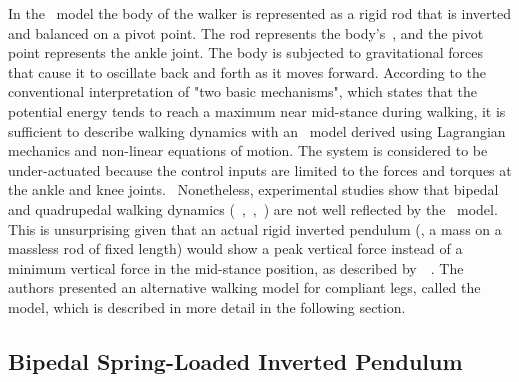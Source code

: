
    In the~ model the body of the walker is represented as a rigid rod that is inverted and balanced on a pivot point. The rod represents the body's~, and the pivot point represents the ankle joint. The body is subjected to gravitational forces that cause it to oscillate back and forth as it moves forward. According to the conventional interpretation of "two basic mechanisms", which states that the potential energy tends to reach a maximum near mid-stance during walking, it is sufficient to describe walking dynamics with an~ model derived using Lagrangian mechanics and non-linear equations of motion. The system is considered to be under-actuated because the control inputs are limited to the forces and torques at the ankle and knee joints.~\cite{Lee2018} Nonetheless, experimental studies show that bipedal and quadrupedal walking dynamics (\eg~\cite{Lee1998},~\cite{Griffin2004},~\cite{Genin2010}) are not well reflected by the~ model. This is unsurprising given that an actual rigid inverted pendulum (\ie, a mass on a massless rod of fixed length) would show a peak vertical force instead of a minimum vertical force in the mid-stance position, as described by~\citeauthor{Geyer2006}~\cite{Geyer2006}. The authors presented an alternative walking model for compliant legs, called the~ model, which is described in more detail in the following section.

    \subsection{Bipedal Spring-Loaded Inverted Pendulum}

